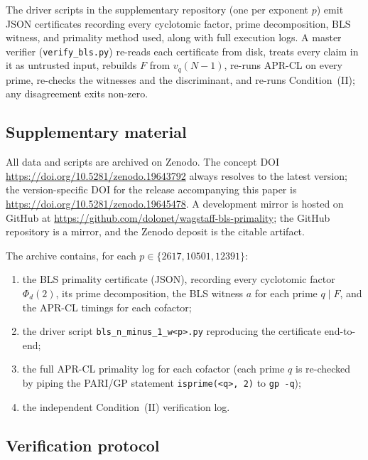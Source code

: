 \documentclass[11pt,a4paper]{amsart}
\theoremstyle{plain}
\theoremstyle{definition}
\begin{document}
The driver scripts in the supplementary repository (one per exponent
$p$) emit JSON certificates recording every cyclotomic factor, prime
decomposition, BLS witness, and primality method used, along with full
execution logs. A master verifier (\texttt{verify\_bls.py}) re-reads
each certificate from disk, treats every claim in it as untrusted
input, rebuilds $F$ from $v_q(N-1)$, re-runs APR-CL on every prime,
re-checks the witnesses and the discriminant, and re-runs
Condition~(II); any disagreement exits non-zero.

\subsection{Supplementary material}
\label{sec:supplementary}

All data and scripts are archived on Zenodo. The concept DOI
\url{https://doi.org/10.5281/zenodo.19643792} always resolves to the
latest version; the version-specific DOI for the release accompanying
this paper is \url{https://doi.org/10.5281/zenodo.19645478}. A
development mirror is hosted on GitHub at
\url{https://github.com/dolonet/wagstaff-bls-primality}; the GitHub
repository is a mirror, and the Zenodo deposit is the citable
artifact.

The archive contains, for each $p \in \{2617, 10501, 12391\}$:

\begin{enumerate}
\item the BLS primality certificate (JSON), recording every
  cyclotomic factor $\Phi_d(2)$, its prime decomposition, the BLS
  witness $a$ for each prime $q \mid F$, and the APR-CL timings for
  each cofactor;
\item the driver script \texttt{bls\_n\_minus\_1\_w<p>.py}
  reproducing the certificate end-to-end;
\item the full APR-CL primality log for each cofactor (each prime $q$
  is re-checked by piping the PARI/GP statement
  \texttt{isprime(<q>, 2)} to \texttt{gp -q});
\item the independent Condition~(II) verification log.
\end{enumerate}

\subsection{Verification protocol}
\end{document}
